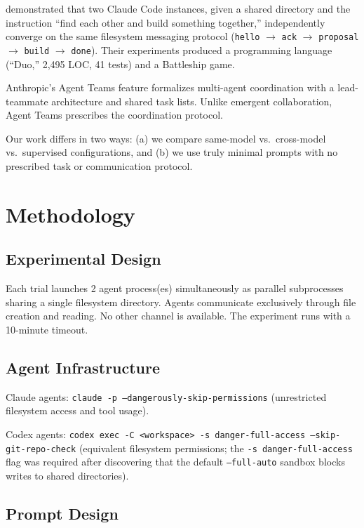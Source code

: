\documentclass[11pt,a4paper]{article}
\begin{document}
\citet{papailiopoulos2026} demonstrated that two Claude Code instances, given a shared
directory and the instruction ``find each other and build something together,''
independently converge on the same filesystem messaging protocol
(\texttt{hello} $\to$ \texttt{ack} $\to$ \texttt{proposal} $\to$ \texttt{build} $\to$
\texttt{done}). Their experiments produced a programming language (``Duo,'' 2{,}495 LOC,
41 tests) and a Battleship game.

Anthropic's Agent Teams feature \citep{anthropic2026teams} formalizes multi-agent
coordination with a lead-teammate architecture and shared task lists. Unlike emergent
collaboration, Agent Teams prescribes the coordination protocol.

Our work differs in two ways: (a) we compare same-model vs.\ cross-model vs.\
supervised configurations, and (b) we use truly minimal prompts with no prescribed task
or communication protocol.

\section{Methodology}

\subsection{Experimental Design}

Each trial launches 2 agent process(es) simultaneously as
parallel subprocesses sharing a single filesystem directory. Agents communicate
exclusively through file creation and reading. No other channel is available. The
experiment runs with a 10-minute timeout.

\subsection{Agent Infrastructure}

Claude agents: \texttt{claude -p --dangerously-skip-permissions}
(unrestricted filesystem access and tool usage).

Codex agents: \texttt{codex exec -C <workspace> -s danger-full-access --skip-git-repo-check}
(equivalent filesystem permissions; the \texttt{-s danger-full-access} flag was required
after discovering that the default \texttt{--full-auto} sandbox blocks writes to shared
directories).

\subsection{Prompt Design}
\end{document}
